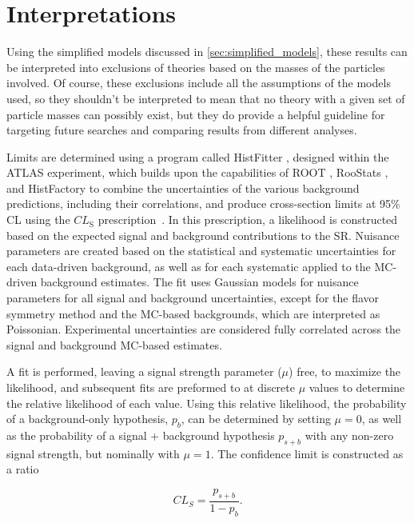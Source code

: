 
\chapter{Interpretations} %
\label{ch:interpretations} 

Using the simplified models discussed in \autoref{sec:simplified_models}, these results can be interpreted into exclusions of theories based on the masses of the particles involved. Of course, these exclusions include all the assumptions of the models used, so they shouldn't be interpreted to mean that no theory with a given set of particle masses can possibly exist, but they do provide a helpful guideline for targeting future searches and comparing results from different analyses.

Limits are determined using a program called HistFitter \cite{Baak:2014wma}, designed within the ATLAS experiment, which builds upon the capabilities of ROOT \cite{BRUN199781}, RooStats \cite{1009.1003}, and HistFactory \cite{Cranmer:2012sba} to combine the uncertainties of the various background predictions, including their correlations, and produce cross-section limits at 95\% \ac{CL} using the $CL_{\text{S}}$ prescription~\cite{statforumlimits,clsread}. In this prescription, a likelihood is constructed based on the expected signal and background contributions to the \ac{SR}. Nuisance parameters are created based on the statistical and systematic uncertainties for each data-driven background, as well as for each systematic applied to the \ac{MC}-driven background estimates. The fit uses Gaussian models for nuisance parameters for all signal and background uncertainties, except for the flavor symmetry method and the \ac{MC}-based backgrounds, which are interpreted as Poissonian. Experimental uncertainties are considered fully correlated across the signal and background \ac{MC}-based estimates. 

A fit is performed, leaving a signal strength parameter ($\mu$) free, to maximize the likelihood, and subsequent fits are preformed to at discrete $\mu$ values to determine the relative likelihood of each value. Using this relative likelihood, the probability of a background-only hypothesis, $p_b$, can be determined by setting $\mu=0$, as well as the probability of a signal + background hypothesis $p_{s+b}$ with any non-zero signal strength, but nominally with $\mu=1$. The confidence limit is constructed as a ratio

\begin{equation}
CL_S = \frac{p_{s+b}}{1-p_b}. 
\end{equation}

